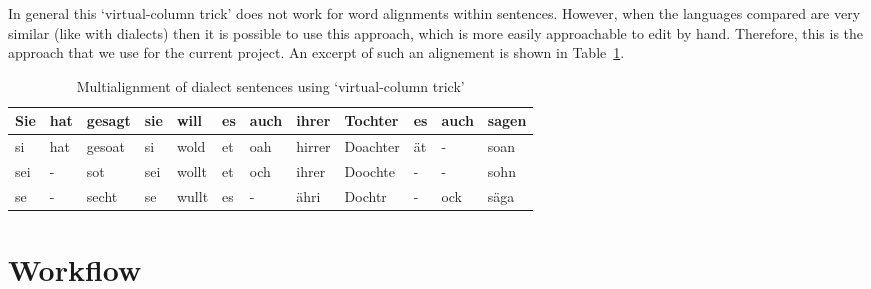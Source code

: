 \documentclass[11pt]{article}
\begin{document}
In general this `virtual-column trick' does not work for word alignments within sentences. However, when the languages compared are very similar (like with dialects) then it is possible to use this approach, which is more easily approachable to edit by hand. Therefore, this is the approach that we use for the current project. An excerpt of such an alignement is shown in Table~\ref{tab:wenker_example}.

\begin{table}[htp]
  \centering
  \begin{tabular}{llllllllllll} \hline
    Sie & hat & gesagt & sie & will & es & auch & ihrer & Tochter & es & auch & sagen \\ \hline
	si & hat & gesoat & si & wold & et & oah & hirrer & Doachter & ät & - & soan \\
    sei & - & sot & sei & wollt & et & och & ihrer & Doochte & - & - & sohn \\
    se & - & secht & se & wullt & es & - & ähri & Dochtr & - & ock & säga \\ \hline
  \end{tabular}
  \caption{Multialignment of dialect sentences using `virtual-column trick'}
  \label{tab:wenker_example}
\end{table}

\section{Workflow}

\printbibliography
\end{document}
